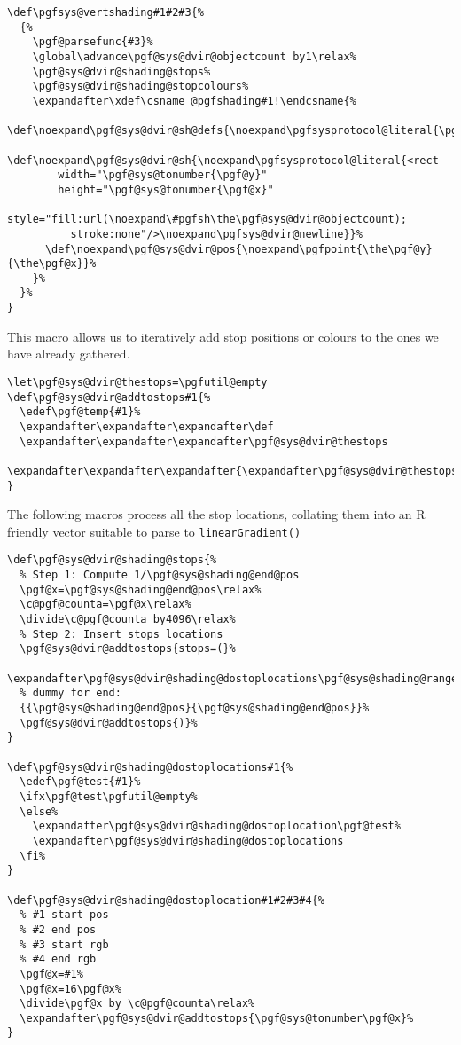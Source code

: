 \documentclass[]{article}
\begin{document}
\begin{verbatim}
\def\pgfsys@vertshading#1#2#3{%
  {%
    \pgf@parsefunc{#3}%
    \global\advance\pgf@sys@dvir@objectcount by1\relax%
    \pgf@sys@dvir@shading@stops%
    \pgf@sys@dvir@shading@stopcolours%
    \expandafter\xdef\csname @pgfshading#1!\endcsname{%
      \def\noexpand\pgf@sys@dvir@sh@defs{\noexpand\pgfsysprotocol@literal{\pgf@sys@dvir@thestops}}%
      \def\noexpand\pgf@sys@dvir@sh{\noexpand\pgfsysprotocol@literal{<rect
        width="\pgf@sys@tonumber{\pgf@y}"
        height="\pgf@sys@tonumber{\pgf@x}"
        style="fill:url(\noexpand\#pgfsh\the\pgf@sys@dvir@objectcount);
          stroke:none"/>\noexpand\pgfsys@dvir@newline}}%
      \def\noexpand\pgf@sys@dvir@pos{\noexpand\pgfpoint{\the\pgf@y}{\the\pgf@x}}%
    }%
  }%
}
\end{verbatim}

This macro allows us to iteratively add stop positions or colours to the
ones we have already gathered.

\begin{verbatim}
\let\pgf@sys@dvir@thestops=\pgfutil@empty
\def\pgf@sys@dvir@addtostops#1{%
  \edef\pgf@temp{#1}%
  \expandafter\expandafter\expandafter\def
  \expandafter\expandafter\expandafter\pgf@sys@dvir@thestops
  \expandafter\expandafter\expandafter{\expandafter\pgf@sys@dvir@thestops\expandafter\space\pgf@temp}%
}
\end{verbatim}

The following macros process all the stop locations, collating them into
an R friendly vector suitable to parse to \texttt{linearGradient()}

\begin{verbatim}
\def\pgf@sys@dvir@shading@stops{%
  % Step 1: Compute 1/\pgf@sys@shading@end@pos
  \pgf@x=\pgf@sys@shading@end@pos\relax%
  \c@pgf@counta=\pgf@x\relax%
  \divide\c@pgf@counta by4096\relax%
  % Step 2: Insert stops locations 
  \pgf@sys@dvir@addtostops{stops=(}%
  \expandafter\pgf@sys@dvir@shading@dostoplocations\pgf@sys@shading@ranges%
  % dummy for end:
  {{\pgf@sys@shading@end@pos}{\pgf@sys@shading@end@pos}}%
  \pgf@sys@dvir@addtostops{)}%
}

\def\pgf@sys@dvir@shading@dostoplocations#1{%
  \edef\pgf@test{#1}%
  \ifx\pgf@test\pgfutil@empty%
  \else%
    \expandafter\pgf@sys@dvir@shading@dostoplocation\pgf@test%
    \expandafter\pgf@sys@dvir@shading@dostoplocations
  \fi%
}

\def\pgf@sys@dvir@shading@dostoplocation#1#2#3#4{%
  % #1 start pos
  % #2 end pos
  % #3 start rgb
  % #4 end rgb
  \pgf@x=#1%
  \pgf@x=16\pgf@x%
  \divide\pgf@x by \c@pgf@counta\relax%
  \expandafter\pgf@sys@dvir@addtostops{\pgf@sys@tonumber\pgf@x}%
}
\end{verbatim}
\end{document}
